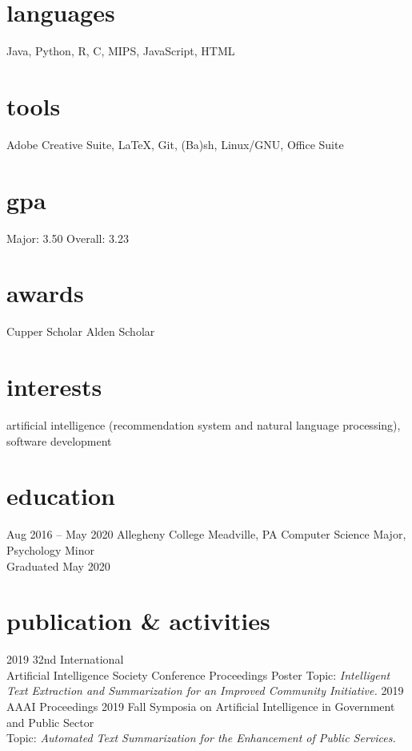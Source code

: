 \documentclass[]{friggeri-cv}
\begin{document}
\begin{aside}
  \section{languages}\vspace{0.05cm}
    Java, Python, R, C, MIPS, JavaScript, HTML\vspace{0.1cm}
  \section{tools}\vspace{0.05cm}
    Adobe Creative Suite, \LaTeX, Git, (Ba)sh, Linux/GNU, Office Suite
  \section{gpa}\vspace{0.1cm}
  	Major: 3.50
    Overall: 3.23\vspace{0.1cm}
  \section{awards}\vspace{0.05cm}
  Cupper Scholar\vspace{0.1cm}
  Alden Scholar\vspace{0.1cm}
\end{aside}

\section{interests}

artificial intelligence (recommendation system and natural language processing), software development

\section{education}
\begin{entrylist}
  \entry
    {Aug 2016 -- May 2020}
    {Allegheny College}
    {Meadville, PA}
    {Computer Science Major, Psychology Minor\\Graduated May 2020}
\end{entrylist}

\section{publication \& activities}
\begin{entrylist}
  \entry
    {2019}
    {32nd International \\Artificial Intelligence Society Conference}
    {Proceedings Poster}
    {Topic: \emph{Intelligent Text Extraction and Summarization for an Improved Community Initiative.}}
  \entry
    {2019}
    {AAAI}
    {Proceedings}
    {2019 Fall Symposia on Artificial Intelligence in Government and Public Sector
    \\Topic: \emph{Automated Text Summarization for the Enhancement of Public Services.}}
\end{entrylist}
\end{document}
